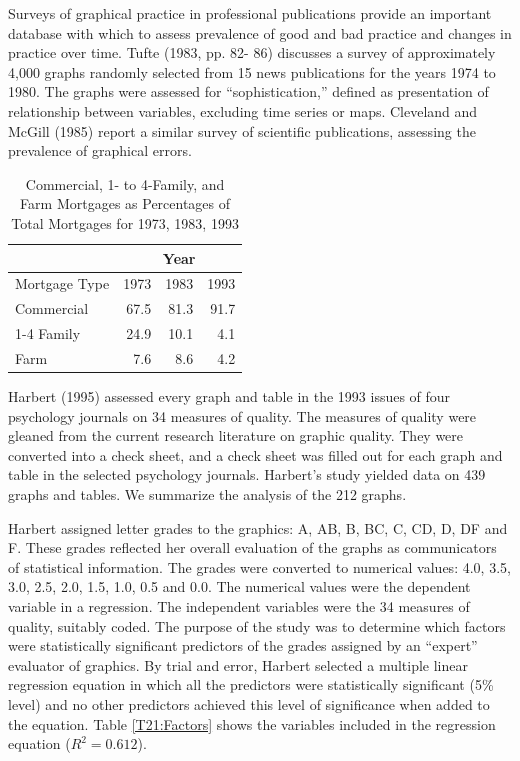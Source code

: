 Surveys of graphical practice in professional publications provide
an important database with which to assess prevalence of good and
bad practice and changes in practice over time. Tufte (1983, pp. 82-
86) discusses a survey of approximately 4,000 graphs randomly
selected from 15 news publications for the years 1974 to 1980. The
graphs were assessed for ``sophistication,'' defined as presentation
of relationship between variables, excluding time series or maps.
Cleveland and McGill (1985) report a similar survey of scientific
publications, assessing the prevalence of graphical errors.

\begin{table}[h] 
\caption{\label{T21:Mortgages} Commercial, 1- to 4-Family, and Farm
Mortgages \newline as Percentages of Total Mortgages for 1973, 1983,
1993}
\begin{tabular}{lrrr}
\hline
 & \multicolumn{3}{c}{Year}\\
\hline Mortgage Type
 & 1973 & 1983 & 1993 \\ \hline
Commercial & 67.5 & 81.3 & 91.7 \\
1-4 Family & 24.9 & 10.1 & 4.1 \\
Farm & 7.6 & 8.6 & 4.2 \\ \hline
\end{tabular}
\end{table}

Harbert (1995) assessed every graph and table in the 1993 issues of
four psychology journals on 34 measures of quality. The measures of
quality were gleaned from the current research literature on graphic
quality. They were converted into a check sheet, and a check sheet
was filled out for each graph and table in the selected psychology
journals. Harbert's study yielded data on 439 graphs and tables. We
summarize the analysis of the 212 graphs.

Harbert assigned letter grades to the graphics: A, AB, B, BC, C, CD,
D, DF and F. These grades reflected her overall evaluation of the
graphs as communicators of statistical information. The grades were
converted to numerical values: 4.0, 3.5, 3.0, 2.5, 2.0, 1.5, 1.0,
0.5 and 0.0. The numerical values were the dependent variable in a
regression. The independent variables were the 34 measures of
quality, suitably coded. The purpose of the study was to determine
which factors were statistically significant predictors of the
grades assigned by an ``expert'' evaluator of graphics. By trial and
error, Harbert selected a multiple linear regression equation in
which all the predictors were statistically significant (5\% level)
and no other predictors achieved this level of significance when
added to the equation. Table \ref{T21:Factors} shows the variables
included in the regression equation ($R^2 = 0.612$).




